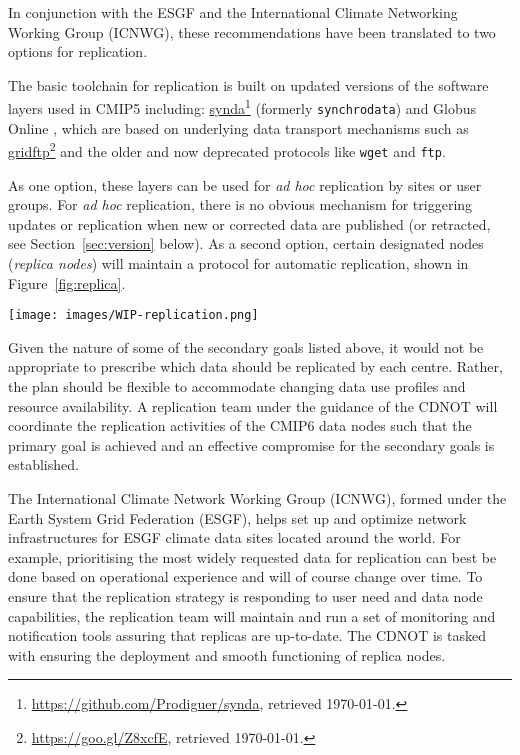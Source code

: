 \documentclass[gmd,manuscript]{copernicus}
\newcommand{\urlref}[2] {\href{#1}{#2}\footnote{\url{#1}, retrieved \today.}}
\begin{document}
In conjunction with the ESGF and the International Climate Networking
Working Group (ICNWG), these recommendations have been translated to
two options for replication.

The basic toolchain for replication is built on updated versions of
the software layers used in CMIP5 including:
\urlref{https://github.com/Prodiguer/synda}{synda} (formerly
\texttt{synchrodata}) and Globus Online \citep{ref:chardetal2015}, which
are based on underlying data transport mechanisms such as
\urlref{https://goo.gl/Z8xcfE}{gridftp} and the older and now deprecated
protocols like \texttt{wget} and \texttt{ftp}.

As one option, these layers can be used for \emph{ad hoc} replication by
sites or user groups. For \emph{ad hoc} replication, there is no
obvious mechanism for triggering updates or replication when new or
corrected data are published (or retracted, see Section~\ref{sec:version} below).
As a second option, certain designated nodes (\emph{replica nodes}) will maintain a protocol
for automatic replication, shown in Figure~\ref{fig:replica}.

\begin{figure*}
  \begin{center}
    \texttt{[image: images/WIP-replication.png]}
  \end{center}
  \caption{CMIP6 replication from data nodes to replica centres and
    between replica centres coordinated by a CMIP6 replication team,
    under the guidance of the CDNOT.}
  \label{fig:replica}
\end{figure*}

Given the nature of some of the secondary goals listed above, it would
not be appropriate to prescribe which data should be replicated by
each centre. Rather, the plan should be flexible to accommodate
changing data use profiles and resource availability.
A replication team under the guidance of the CDNOT will coordinate the
replication activities of the CMIP6 data nodes such that the primary
goal is achieved and an effective compromise for the secondary goals
is established.

The International Climate Network Working Group (ICNWG), formed under
the Earth System Grid Federation (ESGF), helps set up and optimize
network infrastructures for ESGF climate data sites located around the
world. For example, prioritising the most widely requested data for
replication can best be done based on operational experience and will
of course change over time. To ensure that the replication strategy is
responding to user need and data node capabilities, the replication
team will maintain and run a set of monitoring and notification tools
assuring that replicas are up-to-date. The CDNOT is tasked with
ensuring the deployment and smooth functioning of replica nodes.
\end{document}
